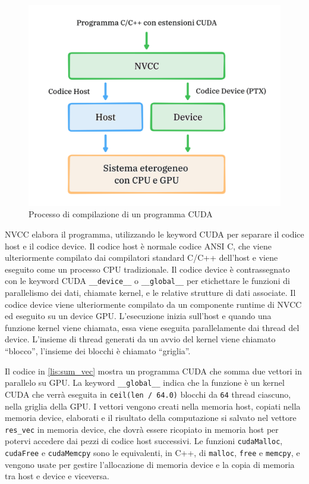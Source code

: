 \begin{figure}[ht]
    \centering
    \includegraphics[width=.9\linewidth]{images/chapter2/nvcc.png}
    \caption{Processo di compilazione di un programma CUDA}
    \label{fig:nvcc}
\end{figure}

NVCC elabora il programma, utilizzando le keyword CUDA per separare il codice host e il codice device. Il codice host è normale codice ANSI C, che viene ulteriormente compilato dai compilatori standard C/C++ dell'host e viene eseguito come un processo CPU tradizionale. Il codice device è contrassegnato con le keyword CUDA \verb|__device__| o \verb|__global__| per etichettare le funzioni di parallelismo dei dati, chiamate kernel, e le relative strutture di dati associate. Il codice device viene ulteriormente compilato da un componente runtime di NVCC ed eseguito su un device GPU. L'esecuzione inizia sull'host e quando una funzione kernel viene chiamata, essa viene eseguita parallelamente dai thread del device. L'insieme di thread generati da un avvio del kernel viene chiamato ``blocco'', l'insieme dei blocchi è chiamato ``griglia''.

\vspace{5mm}
 
\vspace{5mm}

Il codice in \ref*{lis:sum_vec} mostra un programma CUDA che somma due vettori in parallelo su GPU. La keyword \verb|__global__| indica che la funzione è un kernel CUDA che verrà eseguita in \verb|ceil(len / 64.0)| blocchi da \verb|64| thread ciascuno, nella griglia della GPU. I vettori vengono creati nella memoria host, copiati nella memoria device, elaborati e il risultato della computazione si salvato nel vettore \verb|res_vec| in memoria device, che dovrà essere ricopiato in memoria host per potervi accedere dai pezzi di codice host successivi. Le funzioni \verb|cudaMalloc|, \verb|cudaFree| e \verb|cudaMemcpy| sono le equivalenti, in C++, di \verb|malloc|, \verb|free| e \verb|memcpy|, e vengono usate per gestire l'allocazione di memoria device e la copia di memoria tra host e device e viceversa.

